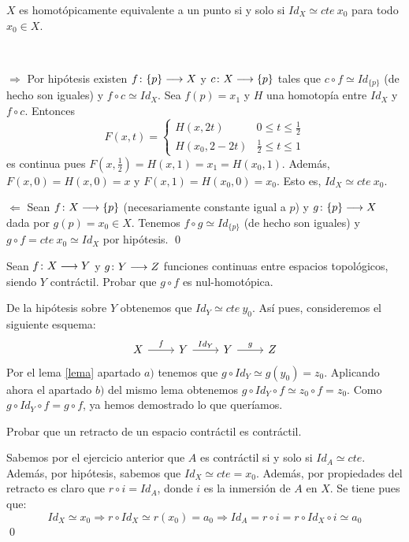 \documentclass[GTS.tex]{subfiles}
\begin{document}
\begin{ejer} $X$ es homotópicamente equivalente a un punto si y solo si $Id_X\simeq cte\ x_0$ para todo $x_0\in X$.
\end{ejer}
\begin{solucion}\ 

$\boxed{\Rightarrow}$ Por hipótesis  existen $f\colon{\{p\}}\longrightarrow{X}$ y $c\colon{X}\longrightarrow{\{p\}}$ tales que $c\circ f\simeq Id_{\{p\}}$ (de hecho son iguales) y $f\circ c\simeq Id_X$. Sea $f(p)=x_1$ y $H$ una homotopía entre $Id_X$ y $f\circ c$. Entonces
\[
F(x,t)=\begin{cases}
H(x,2t) & 0\leq t\leq\frac{1}{2}\\
H(x_0,2-2t) & \frac{1}{2}\leq t\leq 1
\end{cases}
\]
es continua pues $F(x,\frac{1}{2})=H(x,1)=x_1=H(x_0,1)$. Además, $F(x,0)=H(x,0)=x$ y $F(x,1)=H(x_0,0)=x_0$. Esto es, $Id_X\simeq cte\ x_0$.

$\boxed{\Leftarrow}$ Sean $f\colon{X}\longrightarrow{\{p\}}$ (necesariamente constante igual a $p$) y $g\colon{\{p\}}\longrightarrow{X}$ dada por $g(p)= x_0\in X$. Tenemos $f\circ g\simeq Id_{\{p\}}$ (de hecho son iguales) y $g\circ f=cte\ x_0\simeq Id_X$ por hipótesis. \qed
\end{solucion}

\begin{ejer} Sean $f\colon{X}\longrightarrow{Y}$ y $g\colon{Y}\longrightarrow{Z}$ funciones continuas entre espacios topológicos, siendo $Y$ contráctil. Probar que $g\circ f$ es nul-homotópica.
\end{ejer}
\begin{solucion}
De la hipótesis sobre $Y$ obtenemos que $Id_Y\simeq cte\ y_0$. Así pues, consideremos el siguiente esquema:
\[
\begin{tikzcd}
X \arrow[r,"f"]& Y \arrow[r, "Id_Y"] &  Y \arrow[r,"g"] & Z 
\end{tikzcd}
\]
Por el lema \ref{lema} apartado $a)$ tenemos que $g\circ Id_Y\simeq g(y_0)=z_0$. Aplicando ahora el apartado $b)$ del mismo lema obtenemos $g\circ Id_Y\circ f\simeq z_0\circ f=z_0$. Como $g\circ Id_Y\circ f= g\circ f$, ya hemos demostrado lo que queríamos.
\end{solucion}


\begin{ejer}
Probar que un retracto de un espacio contráctil es contráctil.
\end{ejer}
\begin{solucion}
Sabemos por el ejercicio anterior que $A$ es contráctil si y solo si $Id_A\simeq cte$. Además, por hipótesis, sabemos que $Id_X \simeq cte = x_0$. Además, por propiedades del retracto es claro que $r \circ i = Id_A$, donde $i$ es la inmersión de $A$ en $X$. Se tiene pues que:
\[
Id_X \simeq x_0 \Rightarrow r \circ Id_X \simeq r(x_0) = a_0 \Rightarrow Id_A = r \circ i = r \circ Id_X \circ i \simeq a_0 
\]
\qed
\end{solucion}
\end{document}
